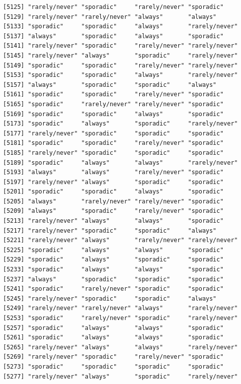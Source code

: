 \documentclass[
  letterpaper,
  DIV=11,
  numbers=noendperiod]{scrartcl}
\begin{document}
\begin{verbatim}
[5125] "rarely/never" "sporadic"     "rarely/never" "sporadic"    
[5129] "rarely/never" "rarely/never" "always"       "always"      
[5133] "sporadic"     "sporadic"     "always"       "rarely/never"
[5137] "always"       "sporadic"     "always"       "sporadic"    
[5141] "rarely/never" "sporadic"     "rarely/never" "rarely/never"
[5145] "rarely/never" "always"       "sporadic"     "rarely/never"
[5149] "sporadic"     "sporadic"     "rarely/never" "rarely/never"
[5153] "sporadic"     "sporadic"     "always"       "rarely/never"
[5157] "always"       "sporadic"     "sporadic"     "always"      
[5161] "sporadic"     "sporadic"     "rarely/never" "sporadic"    
[5165] "sporadic"     "rarely/never" "rarely/never" "sporadic"    
[5169] "sporadic"     "sporadic"     "always"       "sporadic"    
[5173] "sporadic"     "always"       "sporadic"     "rarely/never"
[5177] "rarely/never" "sporadic"     "sporadic"     "sporadic"    
[5181] "sporadic"     "sporadic"     "rarely/never" "sporadic"    
[5185] "rarely/never" "sporadic"     "sporadic"     "sporadic"    
[5189] "sporadic"     "always"       "always"       "rarely/never"
[5193] "always"       "always"       "rarely/never" "sporadic"    
[5197] "rarely/never" "always"       "sporadic"     "sporadic"    
[5201] "sporadic"     "sporadic"     "always"       "sporadic"    
[5205] "always"       "rarely/never" "rarely/never" "sporadic"    
[5209] "always"       "sporadic"     "rarely/never" "sporadic"    
[5213] "rarely/never" "always"       "always"       "sporadic"    
[5217] "rarely/never" "sporadic"     "sporadic"     "always"      
[5221] "rarely/never" "always"       "rarely/never" "rarely/never"
[5225] "sporadic"     "always"       "always"       "sporadic"    
[5229] "sporadic"     "always"       "sporadic"     "sporadic"    
[5233] "sporadic"     "always"       "always"       "sporadic"    
[5237] "always"       "sporadic"     "sporadic"     "sporadic"    
[5241] "sporadic"     "rarely/never" "sporadic"     "sporadic"    
[5245] "rarely/never" "sporadic"     "sporadic"     "always"      
[5249] "rarely/never" "rarely/never" "always"       "rarely/never"
[5253] "sporadic"     "rarely/never" "sporadic"     "rarely/never"
[5257] "sporadic"     "always"       "always"       "sporadic"    
[5261] "sporadic"     "always"       "always"       "sporadic"    
[5265] "rarely/never" "always"       "always"       "rarely/never"
[5269] "rarely/never" "sporadic"     "rarely/never" "sporadic"    
[5273] "sporadic"     "sporadic"     "sporadic"     "sporadic"    
[5277] "rarely/never" "always"       "sporadic"     "rarely/never"

\end{verbatim}
\end{document}
